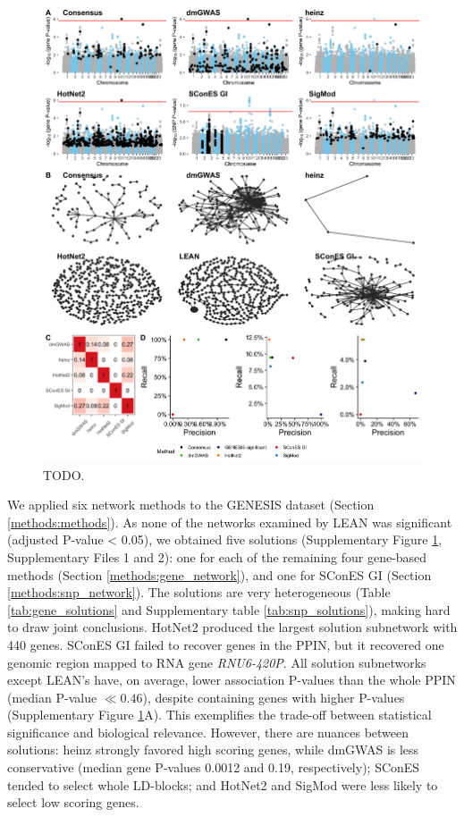 \documentclass[twocolumn, 11pt, draft]{article}
\begin{document}
\begin{figure}[htbp]
  \centering
  \includegraphics[width=.9\linewidth]{./figures/figure_1.png}
  \caption{\label{fig:solution_overview} TODO.}
\end{figure}

We applied six network methods to the GENESIS dataset (Section \ref{methods:methods}). As none of the networks examined by LEAN was significant (adjusted P-value < 0.05), we obtained five solutions (Supplementary Figure \ref{fig:solution_overview}, Supplementary Files 1 and 2): one for each of the remaining four gene-based methods (Section \ref{methods:gene_network}), and one for SConES GI (Section \ref{methods:snp_network}). The solutions are very heterogeneous (Table \ref{tab:gene_solutions} and Supplementary table \ref{tab:snp_solutions}), making hard to draw joint conclusions. HotNet2 produced the largest solution subnetwork with 440 genes. SConES GI failed to recover genes in the PPIN, but it recovered one genomic region mapped to RNA gene \emph{RNU6-420P}. All solution subnetworks except LEAN's have, on average, lower association P-values than the whole PPIN (median P-value $\ll 0.46$), despite containing genes with higher P-values (Supplementary Figure \ref{fig:solution_overview}A). This exemplifies the trade-off between statistical significance and biological relevance. However, there are nuances between solutions: heinz strongly favored high scoring genes, while dmGWAS is less conservative (median gene P-values 0.0012 and 0.19, respectively); SConES tended to select whole LD-blocks; and HotNet2 and SigMod were less likely to select low scoring genes. 
\end{document}
